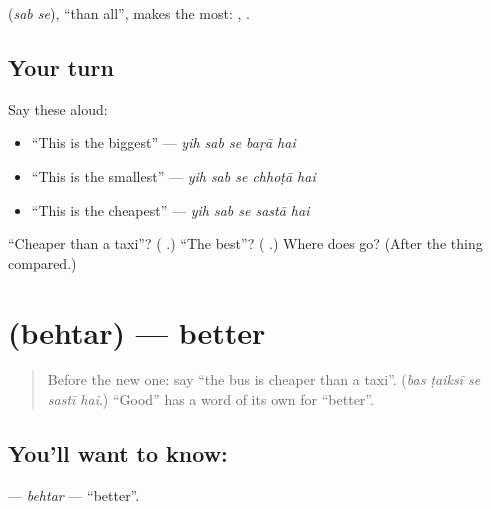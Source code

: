 \textbf{ } (\emph{sab se}), \textquotedblleft{}than all\textquotedblright{}, makes the most: \textbf{  }, \textbf{  }.

\subsection*{Your turn}
Say these aloud:

\begin{itemize}
\raggedright
  \item \textquotedblleft{}This is the biggest\textquotedblright{} — \emph{yih sab se baṛā hai}
  \item \textquotedblleft{}This is the smallest\textquotedblright{} — \emph{yih sab se chhoṭā hai}
  \item \textquotedblleft{}This is the cheapest\textquotedblright{} — \emph{yih sab se sastā hai}
\end{itemize}

\begin{tcolorbox}[breakable,colback=teal!4,colframe=teal!35!black,title={Before you move on}]
\textquotedblleft{}Cheaper than a taxi\textquotedblright{}? (\textbf{  }.) \textquotedblleft{}The best\textquotedblright{}? (\textbf{  }.) Where does \textbf{} go? (After the thing compared.)
\end{tcolorbox}
\section[\texorpdfstring{\ur{بہتر} (behtar)}{بہتر (behtar)}]{ (behtar) — better}

\label{lesson:UR-C273-behtar}



\begin{quote}
Before the new one: say \textquotedblleft{}the bus is cheaper than a taxi\textquotedblright{}. (\emph{bas ṭaiksī se sastī hai}.) \textquotedblleft{}Good\textquotedblright{} has a word of its own for \textquotedblleft{}better\textquotedblright{}.
\end{quote}

\subsection*{You'll want to know: }
\textbf{} — \emph{behtar} — \textquotedblleft{}better\textquotedblright{}.

